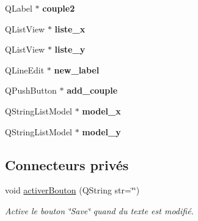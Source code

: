 \begin{DoxyCompactItemize}
\item 
\hypertarget{class_relation_editeur_a7c1d15a6dbf4d0ec867b6a4f9cde7db0}{Q\-Label $\ast$ {\bfseries couple2}}\label{class_relation_editeur_a7c1d15a6dbf4d0ec867b6a4f9cde7db0}

\item 
\hypertarget{class_relation_editeur_a0b925426401fa901808f7720dad0fe35}{Q\-List\-View $\ast$ {\bfseries liste\-\_\-x}}\label{class_relation_editeur_a0b925426401fa901808f7720dad0fe35}

\item 
\hypertarget{class_relation_editeur_ab443cf68744c2b367ea565cc034be39c}{Q\-List\-View $\ast$ {\bfseries liste\-\_\-y}}\label{class_relation_editeur_ab443cf68744c2b367ea565cc034be39c}

\item 
\hypertarget{class_relation_editeur_a3c336e8c1bae8bfd513e1639569cfb19}{Q\-Line\-Edit $\ast$ {\bfseries new\-\_\-label}}\label{class_relation_editeur_a3c336e8c1bae8bfd513e1639569cfb19}

\item 
\hypertarget{class_relation_editeur_ab0c50e29c276fc03fa2a3c5b9fcaa619}{Q\-Push\-Button $\ast$ {\bfseries add\-\_\-couple}}\label{class_relation_editeur_ab0c50e29c276fc03fa2a3c5b9fcaa619}

\item 
\hypertarget{class_relation_editeur_a9b7aad295e2bc9b8c85ec56381914b9f}{Q\-String\-List\-Model $\ast$ {\bfseries model\-\_\-x}}\label{class_relation_editeur_a9b7aad295e2bc9b8c85ec56381914b9f}

\item 
\hypertarget{class_relation_editeur_a747219e4e7bfbe79564ff002bbc81b77}{Q\-String\-List\-Model $\ast$ {\bfseries model\-\_\-y}}\label{class_relation_editeur_a747219e4e7bfbe79564ff002bbc81b77}

\end{DoxyCompactItemize}
\subsection*{Connecteurs privés}
\begin{DoxyCompactItemize}
\item 
\hypertarget{class_relation_editeur_a08f290984e9a90f643f6938a8e1808ff}{void \hyperlink{class_relation_editeur_a08f290984e9a90f643f6938a8e1808ff}{activer\-Bouton} (Q\-String str=\char`\"{}\char`\"{})}\label{class_relation_editeur_a08f290984e9a90f643f6938a8e1808ff}

\begin{DoxyCompactList}\small\item\em Active le bouton \char`\"{}\-Save\char`\"{} quand du texte est modifié. \end{DoxyCompactList}\end{DoxyCompactItemize}


